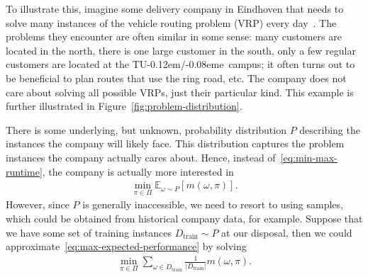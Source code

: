 \documentclass{report}
\theoremstyle{definition}
\theoremstyle{plain}
\newcommand{\TUE}{TU\kern-0.12em/\kern-0.08eme}
\begin{document}
To illustrate this, imagine some delivery company in Eindhoven that needs to
solve many instances of the vehicle routing problem (VRP) every day~\cite{bengioMachineLearningCombinatorial2020}. The
problems they encounter are often similar in some sense: many customers are
located in the north, there is one large customer in the south, only a few
regular customers are located at the \TUE~campus; it often turns out to be
beneficial to plan routes that use the ring road, etc. The company does not care
about solving all possible VRPs, just their particular kind. This example is
further illustrated in Figure~\ref{fig:problem-distribution}.

There is some underlying, but unknown, probability distribution $P$ describing the
instances the company will likely face.
%
This distribution captures the problem instances the company actually cares
about.
%
Hence, instead of~\eqref{eq:min-max-runtime}, the company is actually more
interested in
\begin{align}
  \label{eq:max-expected-performance}
  \min_{\pi \in \Pi} \mathbb{E}_{\omega \sim P} \left[ m(\omega, \pi) \right] .
\end{align}
%
However, since $P$ is generally inaccessible, we need to resort to using
samples, which could be obtained from historical company data, for example.
%
Suppose that we have some set of training instances $D_\text{train} \sim P$ at
our disposal, then we could approximate~\eqref{eq:max-expected-performance} by solving
\begin{align}
  \min_{\pi \in \Pi} \sum_{\omega \in D_\text{train}} \frac{1}{|D_\text{train}|} m(\omega, \pi) .
\end{align}
\end{document}

